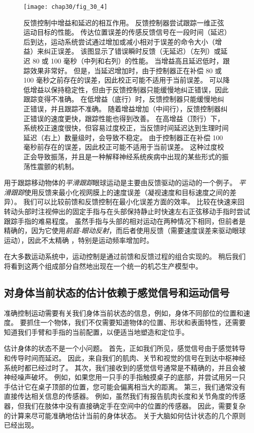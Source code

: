 \begin{figure}[htbp]
	\centering
	\texttt{[image: chap30/fig\_30\_4]}
	\caption{反馈控制中增益和延迟的相互作用。
		反馈控制器尝试跟踪一维正弦运动目标的性能。
		传达位置误差的传感反馈信号在一段时间（延迟）后到达，运动系统尝试通过增加或减小相对于误差的命令大小（增益）来纠正误差。
		该图显示了错误瞬时反馈（无延迟）（左列）或延迟 80 或 100 毫秒（中列和右列）的性能。
		当增益高且延迟低时，跟踪效果非常好。
		但是，当延迟增加时，由于控制器正在补偿 80 或 100 毫秒之前存在的误差，因此校正可能不适用于当前误差。
		可以降低增益以保持稳定性，但由于反馈控制器只能缓慢地纠正错误，因此跟踪变得不准确。
		在低增益（底行）时，反馈控制器只能缓慢地纠正错误，并且跟踪不准确。
		随着增益增加（中间行），反馈控制器纠正错误的速度更快，跟踪性能也得到改善。
		在高增益（顶行）下，系统校正速度很快，但容易过度校正，当反馈时间延迟达到生理时间延迟（右上）数量级时，会导致不稳定。
		由于控制器正在补偿 100 毫秒前存在的误差，因此校正可能不适用于当前误差。
		这种过度校正会导致振荡，并且是一种解释神经系统疾病中出现的某些形式的振荡性震颤的机制。}
	\label{fig:30_4}
\end{figure}


用于跟踪移动物体的\textit{平滑跟踪}眼球运动是主要由反馈驱动的运动的一个例子。
\textit{平滑跟踪}使用反馈来最小化视网膜上的速度误差（凝视速度和目标速度之间的差异）。
我们可以比较前馈和反馈控制在最小化误差方面的效率。
比较在快速来回转动头部时注视伸出的固定手指与在头部保持静止时快速左右正弦移动手指时尝试跟踪手指的难易程度。
虽然手指与头部的相对运动在两种情况下相同，但前者是精确的，因为它使用\textit{前庭-眼动反射}，而后者使用反馈（需要速度误差来驱动眼球运动），因此不太精确 ，特别是运动频率增加时。


在大多数运动系统中，运动控制是通过前馈和反馈过程的组合实现的。
稍后我们将看到这两个组成部分自然地出现在一个统一的机芯生产模型中。



\subsection{对身体当前状态的估计依赖于感觉信号和运动信号}

准确控制运动需要有关我们身体当前状态的信息，例如，身体不同部位的位置和速度。
要抓住一个物体，我们不仅需要知道物体的位置、形状和表面特性，还需要知道我们手臂和手指的当前配置，以便适当地塑造和定位手。


估计身体的状态不是一个小问题。
首先，正如我们所见，感觉信号由于感觉转导和传导时间而延迟。
因此，来自我们的肌肉、关节和视觉的信号在到达中枢神经系统时都已经过时了。
其次，我们接收到的感觉信号通常是不精确的，并且会被神经噪声破坏。
例如，如果您用一只手的手指触摸桌子的底部，并尝试用另一只手估计它在桌子顶部的位置，您可能会偏离相当大的距离。
第三，我们通常没有直接传达相关信息的传感器。
例如，虽然我们有报告肌肉长度和关节角度的传感器，但我们在肢体中没有直接确定手在空间中的位置的传感器。
因此，需要复杂的计算来尽可能准确地估计当前的身体状态。
关于大脑如何估计状态的几个原则已经出现。



